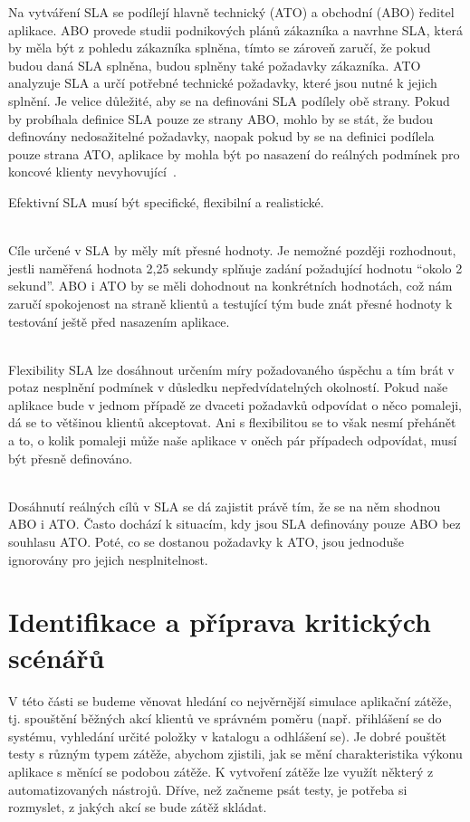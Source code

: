 \documentclass[122pt,oneside]{fithesis}
\begin{document}
Na vytváření SLA se podílejí hlavně technický (ATO) a obchodní (ABO) ředitel aplikace. ABO provede studii podnikových plánů zákazníka a navrhne SLA, která by měla být z pohledu zákazníka splněna, tímto se zároveň zaručí, že pokud budou daná SLA splněna, budou splněny také požadavky zákazníka. ATO analyzuje SLA a určí potřebné technické požadavky, které jsou nutné k jejich splnění. Je velice důležité, aby se na definováni SLA podílely obě strany. Pokud by probíhala definice SLA pouze ze strany ABO, mohlo by se stát, že budou definovány nedosažitelné požadavky, naopak pokud by se na definici podílela pouze strana ATO, aplikace by mohla být po nasazení do reálných podmínek pro koncové klienty nevyhovující~\cite{haines06}.

Efektivní SLA musí být specifické, flexibilní a realistické.

\vspace{5 mm}
\\\indent Cíle určené v SLA by měly mít přesné hodnoty. Je nemožné později rozhodnout, jestli naměřená hodnota 2,25 sekundy splňuje zadání požadující hodnotu “okolo 2 sekund”. ABO i ATO by se měli dohodnout na konkrétních hodnotách, což nám zaručí spokojenost na straně klientů a testující tým bude znát přesné hodnoty k testování ještě před nasazením aplikace.

\vspace{5 mm}
\\\indent Flexibility SLA lze dosáhnout určením míry požadovaného úspěchu a tím brát v potaz nesplnění podmínek v důsledku nepředvídatelných okolností. Pokud naše aplikace bude v jednom případě ze dvaceti požadavků odpovídat o něco pomaleji, dá se to většinou klientů akceptovat. Ani s flexibilitou se to však nesmí přehánět a to, o kolik pomaleji může naše aplikace v oněch pár případech odpovídat, musí být přesně definováno.

\vspace{5 mm}
\\\indent Dosáhnutí reálných cílů v SLA se dá zajistit právě tím, že se na něm shodnou ABO i ATO. Často dochází k situacím, kdy jsou SLA definovány pouze ABO bez souhlasu ATO. Poté, co se dostanou požadavky k ATO, jsou jednoduše ignorovány pro jejich nesplnitelnost.


\section{Identifikace a příprava kritických scénářů}
V této části se budeme věnovat hledání co nejvěrnější simulace aplikační zátěže, tj. spouštění běžných akcí klientů ve správném poměru (např. přihlášení se do systému, vyhledání určité položky v katalogu a odhlášení se). Je dobré pouštět testy s různým typem zátěže, abychom zjistili, jak se mění charakteristika výkonu aplikace s měnící se podobou zátěže. K vytvoření zátěže lze využít některý z automatizovaných nástrojů. Dříve, než začneme psát testy, je potřeba si rozmyslet, z jakých akcí se bude zátěž skládat.
\end{document}
